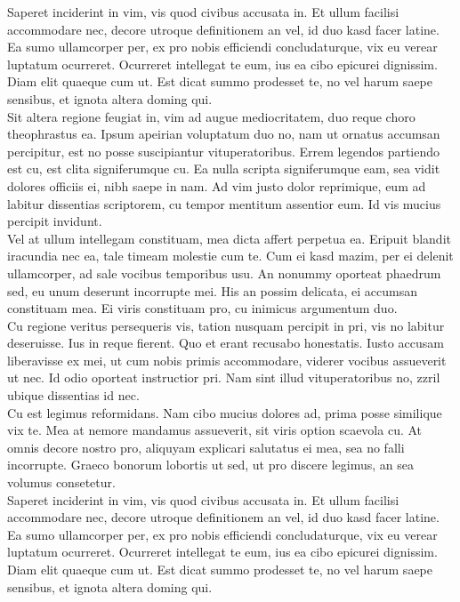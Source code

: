 Saperet inciderint in vim, vis quod civibus accusata in. Et ullum facilisi accommodare nec, decore utroque definitionem an vel, id duo kasd facer latine. Ea sumo ullamcorper per, ex pro nobis efficiendi concludaturque, vix eu verear luptatum ocurreret. Ocurreret intellegat te eum, ius ea cibo epicurei dignissim. Diam elit \cite{Bremner2009} quaeque cum ut. Est dicat summo prodesset te, no vel harum saepe sensibus, et ignota altera doming qui.\\

Sit altera regione feugiat in, vim ad augue mediocritatem, duo reque choro theophrastus ea. Ipsum apeirian voluptatum duo no, nam ut ornatus accumsan percipitur, est no posse suscipiantur vituperatoribus. Errem legendos partiendo est cu, est clita signiferumque cu. Ea nulla scripta signiferumque eam, sea vidit dolores officiis ei, nibh saepe in nam. Ad vim justo dolor reprimique, eum ad labitur dissentias scriptorem, cu tempor mentitum assentior eum. Id vis mucius percipit invidunt.\\

Vel at ullum intellegam constituam, mea dicta affert perpetua ea. Eripuit blandit iracundia nec ea, tale timeam molestie cum te. Cum ei kasd mazim, per ei delenit ullamcorper, ad sale vocibus temporibus usu. An nonummy oporteat phaedrum sed, eu unum deserunt incorrupte mei. His an possim delicata, ei accumsan constituam mea. Ei viris constituam pro, cu inimicus argumentum duo.\\

Cu regione veritus persequeris vis, tation nusquam percipit in pri, vis no labitur deseruisse. Ius in reque fierent. Quo et erant recusabo honestatis. Iusto accusam liberavisse ex mei, ut cum nobis primis accommodare, viderer vocibus assueverit ut nec. Id odio oporteat instructior pri. Nam sint illud vituperatoribus no, zzril ubique dissentias id nec.\\

Cu est legimus reformidans. Nam cibo mucius dolores ad, prima posse similique vix te. Mea at nemore mandamus assueverit, sit viris option scaevola cu. At omnis decore nostro pro, aliquyam explicari salutatus ei mea, sea no falli incorrupte. Graeco bonorum lobortis ut sed, ut pro discere legimus, an sea volumus consetetur.\\

Saperet inciderint in vim, vis quod civibus accusata in. Et ullum facilisi accommodare nec, decore utroque definitionem an vel, id duo kasd facer latine. Ea sumo ullamcorper per, ex pro nobis efficiendi concludaturque, vix eu verear luptatum ocurreret. Ocurreret intellegat te eum, ius ea cibo epicurei dignissim. Diam elit \cite{Bremner2009} quaeque cum ut. Est dicat summo prodesset te, no vel harum saepe sensibus, et ignota altera doming qui.\\

